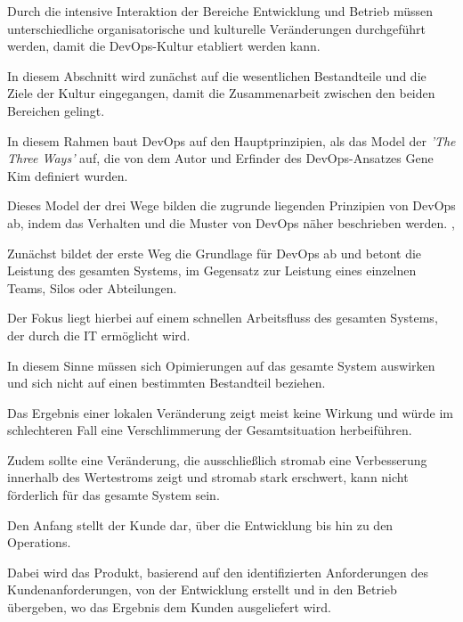 Durch die intensive Interaktion der Bereiche Entwicklung und Betrieb müssen unterschiedliche organisatorische und kulturelle Veränderungen durchgeführt werden, damit die DevOps-Kultur etabliert werden kann. 

In diesem Abschnitt wird zunächst auf die wesentlichen Bestandteile und die Ziele der Kultur eingegangen, damit die Zusammenarbeit zwischen den beiden Bereichen gelingt.

In diesem Rahmen baut DevOps auf den Hauptprinzipien, als das Model der \textit{'The Three Ways'} auf, die von dem Autor und Erfinder des DevOps-Ansatzes Gene Kim \cite{kim_devops-handbuch_2017} definiert wurden. 

Dieses Model der drei Wege bilden die zugrunde liegenden Prinzipien von DevOps ab, indem das Verhalten und die Muster von DevOps näher beschrieben werden. \cite[S. 9 - 44]{kim_devops-handbuch_2017}, \cite{kim_three_2012}  

Zunächst bildet der erste Weg die Grundlage für DevOps ab und betont die Leistung des gesamten Systems, im Gegensatz zur Leistung eines einzelnen Teams, Silos oder Abteilungen. 

Der Fokus liegt hierbei auf einem schnellen Arbeitsfluss des gesamten Systems, der durch die IT ermöglicht wird. 

In diesem Sinne müssen sich Opimierungen auf das gesamte System auswirken und sich nicht auf einen bestimmten Bestandteil beziehen. 

Das Ergebnis einer lokalen Veränderung zeigt meist keine Wirkung und würde im schlechteren Fall eine Verschlimmerung der Gesamtsituation herbeiführen. \cite[S. 252]{tiemeyer_handbuch_2021} 

Zudem sollte eine Veränderung, die ausschließlich stromab eine Verbesserung innerhalb des Wertestroms zeigt und stromab stark erschwert, kann nicht förderlich für das gesamte System sein. \cite[S. 252]{tiemeyer_handbuch_2021}

Den Anfang stellt der Kunde dar, über die Entwicklung bis hin zu den Operations.

Dabei wird das Produkt, basierend auf den identifizierten Anforderungen des Kundenanforderungen, von der Entwicklung erstellt und in den Betrieb übergeben, wo das Ergebnis dem Kunden ausgeliefert wird.\cite[S. 12]{halstenberg_devops_2020} 

